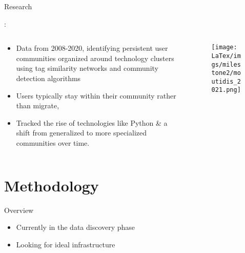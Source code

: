 \documentclass{beamer}
\begin{document}
    \begin{frame}{Research}
        \begin{center}
            \textbf{\textcite{moutidis_community_2021}}:
        \end{center}
        \begin{columns}[c]
            \begin{column}{0.55\textwidth}
                \begin{itemize}
                    \item Data from 2008-2020, identifying persistent user communities organized around technology clusters using tag similarity networks and community detection algorithms
                    \item Users typically stay within their community rather than migrate, 
                    \item Tracked the rise of technologies like Python \& a shift from generalized to more specialized communities over time.
                \end{itemize}
            \end{column}
            \begin{column}{0.4\textwidth}
                \begin{figure}
                    \centering
                    \texttt{[image: LaTex/imgs/milestone2/moutidis\_2021.png]}
                    \caption{\textcite{moutidis_community_2021}}
                    \label{fig:burcher2024}
                \end{figure}
            \end{column}
        \end{columns}
    \end{frame}


    \section{Methodology}

    \begin{frame}{Overview}
        \begin{itemize}
            \item Currently in the data discovery phase
            \item Looking for ideal infrastructure
        \end{itemize}
    \end{frame}
    
\end{document}
